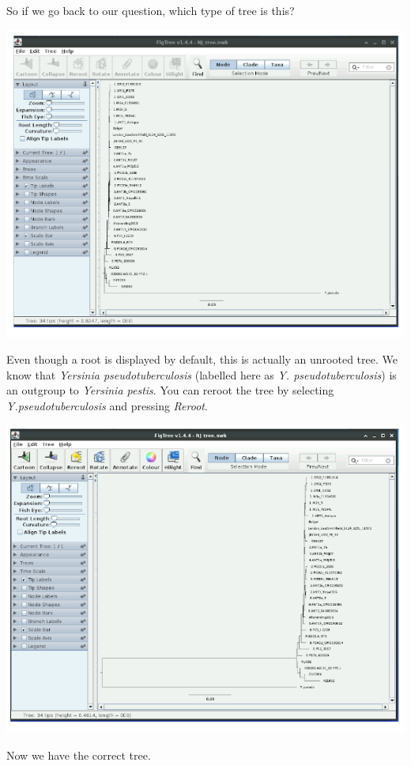 \documentclass[
  letterpaper,
]{book}
\begin{document}
So if we go back to our question, which type of tree is this?

\includegraphics{assets/images/chapters/phylogenomics/13.png}

Even though a root is displayed by default, this is actually an unrooted
tree. We know that \emph{Yersinia pseudotuberculosis} (labelled here as
\emph{Y. pseudotuberculosis}) is an outgroup to \emph{Yersinia pestis}.
You can reroot the tree by selecting \emph{Y.pseudotuberculosis} and
pressing \emph{Reroot}.

\includegraphics{assets/images/chapters/phylogenomics/14.png}

Now we have the correct tree.
\end{document}
